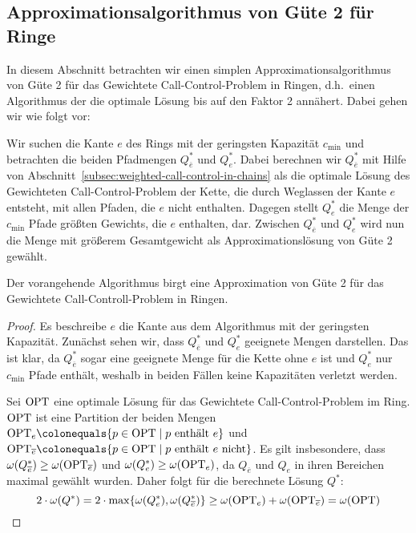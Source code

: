 \subsection{Approximationsalgorithmus von Güte 2 für Ringe}
In diesem Abschnitt betrachten wir einen simplen Approximationsalgorithmus von Güte 2 für das Gewichtete
Call-Control-Problem in Ringen, d.h.\ einen Algorithmus der die optimale Lösung bis auf den Faktor 2 annähert.
Dabei gehen wir wie folgt vor:

Wir suchen die Kante $e$ des Rings mit der geringsten Kapazität $c_{\min}$ und betrachten die beiden Pfadmengen
$Q_{\overline e}^*$ und $Q_{e}^*$.
Dabei berechnen wir $Q_{\overline e}^*$ mit Hilfe von Abschnitt~\ref{subsec:weighted-call-control-in-chains} als die
optimale Lösung des Gewichteten Call-Control-Problem der Kette, die durch
Weglassen der Kante $e$ entsteht, mit allen Pfaden, die $e$ nicht enthalten.
Dagegen stellt $Q_e^*$ die Menge der $c_{\min}$ Pfade größten Gewichts, die $e$ enthalten, dar.
Zwischen $Q_{\overline e}^*$ und $Q_{e}^*$ wird nun die Menge mit größerem Gesamtgewicht als
Approximationslösung von Güte 2 gewählt.

\begin{theorem}
    Der vorangehende Algorithmus birgt eine Approximation von Güte 2 für das Gewichtete Call-Controll-Problem in Ringen.
\end{theorem}
\begin{proof}
    Es beschreibe $e$ die Kante aus dem Algorithmus mit der geringsten Kapazität.
    Zunächst sehen wir, dass $Q_{\overline e}^*$ und $Q_e^*$ geeignete Mengen darstellen.
    Das ist klar, da $Q_{\overline e}^*$ sogar eine geeignete Menge für die Kette ohne $e$ ist und $Q_e^*$ nur $c_{\min}$
    Pfade enthält, weshalb in beiden Fällen keine Kapazitäten verletzt werden.

    Sei $\text{OPT}$ eine optimale Lösung für das Gewichtete Call-Control-Problem im Ring.
    $\text{OPT}$ ist eine Partition der beiden Mengen $\OPT_e \colonequals \{p \in \OPT \mid p\ \text{enthält}\ e\}$ und
    $\OPT_{\overline e} \colonequals \{p\in\OPT\mid p\ \text{enthält}\ e\ \text{nicht}\}$.
    Es gilt insbesondere, dass $\omega(Q_{\overline e}^*) \geq \omega(\text{OPT}_{\overline e})$ und
    $\omega(Q_e^*) \geq \omega(\text{OPT}_{e})$, da $Q_{\overline e}$ und $Q_e$ in ihren Bereichen maximal gewählt wurden.
    Daher folgt für die berechnete Lösung $Q^*$:
    \[2 \cdot \omega(Q^*) = 2 \cdot  \max\{\omega(Q_e^*), \omega(Q_{\overline e}^*)\} \geq
    \omega(\text{OPT}_e) + \omega(\text{OPT}_{\overline e}) = \omega(\text{OPT}) \]
\end{proof}
